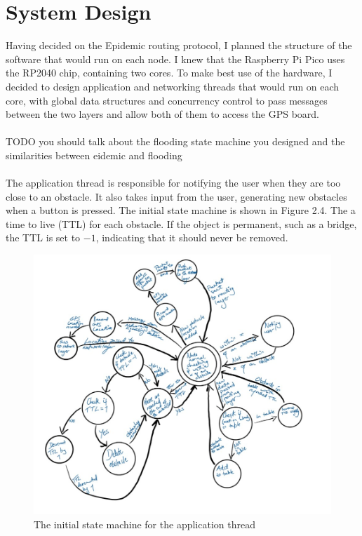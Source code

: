 \documentclass[12pt,a4paper]{report}
\begin{document}
\section{System Design}
Having decided on the Epidemic routing protocol, I planned the structure of the software that would run on each node. I knew that the Raspberry Pi Pico uses the RP2040 chip, containing two cores. To make best use of the hardware, I decided to design application and networking threads that would run on each core, with global data structures and concurrency control to pass messages between the two layers and allow both of them to access the GPS board. \\ \\
TODO you should talk about the flooding state machine you designed and the similarities between eidemic and flooding \\ \\ 
The application thread is responsible for notifying the user when they are too close to an obstacle. It also takes input from the user, generating new obstacles when a button is pressed. The initial state machine is shown in Figure 2.4. The a time to live (TTL) for each obstacle. If the object is permanent, such as a bridge, the TTL is set to $-1$, indicating that it should never be removed.
\begin{figure}[h]
\begin{center}
\caption{The initial state machine for the application thread}
\includegraphics[scale=0.5]{appThread.jpg}
\end{center}
\end{figure}
\end{document}
